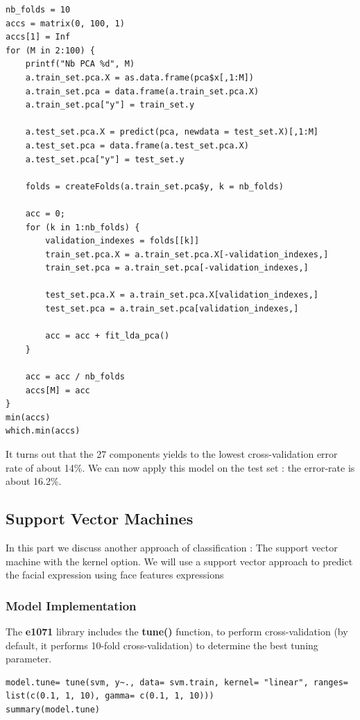 \documentclass[]{report}
\begin{document}
\begin{lstlisting}
nb_folds = 10
accs = matrix(0, 100, 1)
accs[1] = Inf
for (M in 2:100) {
	printf("Nb PCA %d", M)
	a.train_set.pca.X = as.data.frame(pca$x[,1:M])
	a.train_set.pca = data.frame(a.train_set.pca.X)
	a.train_set.pca["y"] = train_set.y
	
	a.test_set.pca.X = predict(pca, newdata = test_set.X)[,1:M]
	a.test_set.pca = data.frame(a.test_set.pca.X)
	a.test_set.pca["y"] = test_set.y
	
	folds = createFolds(a.train_set.pca$y, k = nb_folds)
	
	acc = 0;
	for (k in 1:nb_folds) {
		validation_indexes = folds[[k]]
		train_set.pca.X = a.train_set.pca.X[-validation_indexes,]
		train_set.pca = a.train_set.pca[-validation_indexes,]
		
		test_set.pca.X = a.train_set.pca.X[validation_indexes,]
		test_set.pca = a.train_set.pca[validation_indexes,]
		
		acc = acc + fit_lda_pca()
	}
	
	acc = acc / nb_folds
	accs[M] = acc
}
min(accs)
which.min(accs)
\end{lstlisting}

It turns out that the 27 components yields to the lowest cross-validation error rate of about 14\%. We can now apply this model on the test set : the error-rate is about 16.2\%.



\pagebreak
\subsection{Support Vector Machines}
In this part we discuss another approach of classification : The support vector machine with the kernel option. We will use a support vector approach to predict the facial expression using face features expressions

\subsubsection{Model Implementation}
The \textbf{e1071} library includes the \textbf{tune()} function, to perform cross-validation (by default, it performs 10-fold cross-validation) to determine the best tuning parameter.
\begin{lstlisting}
model.tune= tune(svm, y~., data= svm.train, kernel= "linear", ranges= list(c(0.1, 1, 10), gamma= c(0.1, 1, 10)))
summary(model.tune)
\end{lstlisting}
\end{document}
